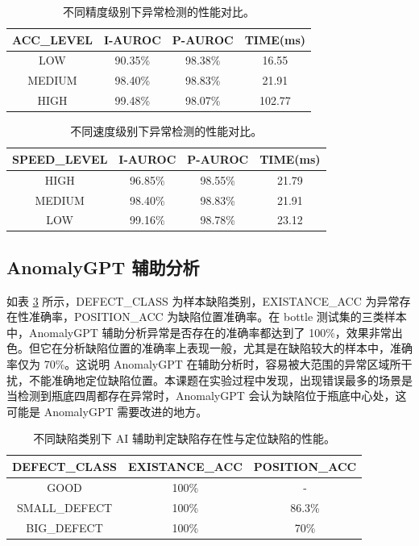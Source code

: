 \documentclass[
  ]{njuthesis}
\begin{document}
\begin{table}[H]
    \centering
    \caption{不同精度级别下异常检测的性能对比。}
    \label{acc_level_comparison}
    \renewcommand\arraystretch{0.5}
    \begin{tabular}{c|c|c|c}
    \toprule[1.5pt]
    ACC\_LEVEL & I-AUROC & P-AUROC & TIME(ms) \\
    \midrule[1pt]
    LOW & 90.35\% & 98.38\% & 16.55 \\
    \midrule[0.5pt]
    MEDIUM & 98.40\% & 98.83\% & 21.91 \\
    \midrule[0.5pt]
    HIGH & 99.48\% & 98.07\% & 102.77 \\
    \bottomrule[1.5pt]
    \end{tabular}
\end{table}

\begin{table}[H]
    \centering
    \caption{不同速度级别下异常检测的性能对比。}
    \label{speed_level_comparison}
    \renewcommand\arraystretch{0.5}
    \begin{tabular}{c|c|c|c}
    \toprule[1.5pt]
    SPEED\_LEVEL & I-AUROC & P-AUROC & TIME(ms) \\
    \midrule[1pt]
    HIGH & 96.85\% & 98.55\% & 21.79 \\
    \midrule[0.5pt]
    MEDIUM & 98.40\% & 98.83\% & 21.91 \\
    \midrule[0.5pt]
    LOW & 99.16\% & 98.78\% & 23.12 \\
    \bottomrule[1.5pt]
    \end{tabular}
\end{table}


\subsection{AnomalyGPT 辅助分析}

如表 \ref{AI_detection_accuracy} 所示，DEFECT\_CLASS 为样本缺陷类别，EXISTANCE\_ACC 为异常存在性准确率，POSITION\_ACC 为缺陷位置准确率。在 bottle 测试集的三类样本中，AnomalyGPT 辅助分析异常是否存在的准确率都达到了 100\%，效果非常出色。但它在分析缺陷位置的准确率上表现一般，尤其是在缺陷较大的样本中，准确率仅为 70\%。这说明 AnomalyGPT 在辅助分析时，容易被大范围的异常区域所干扰，不能准确地定位缺陷位置。本课题在实验过程中发现，出现错误最多的场景是当检测到瓶底四周都存在异常时，AnomalyGPT 会认为缺陷位于瓶底中心处，这可能是 AnomalyGPT 需要改进的地方。

\begin{table}[H]
    \centering
    \caption{不同缺陷类别下 AI 辅助判定缺陷存在性与定位缺陷的性能。}
    \label{AI_detection_accuracy}
    \renewcommand\arraystretch{0.5}
    \begin{tabular}{c|c|c}
    \toprule[1.5pt]
    DEFECT\_CLASS & EXISTANCE\_ACC & POSITION\_ACC \\
    \midrule[1pt]
    GOOD & 100\% & - \\
    \midrule[0.5pt]
    SMALL\_DEFECT & 100\% & 86.3\% \\
    \midrule[0.5pt]
    BIG\_DEFECT & 100\% & 70\% \\
    \bottomrule[1.5pt]
    \end{tabular}
\end{table}
\end{document}
